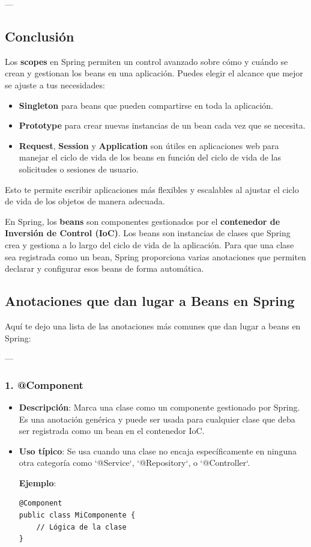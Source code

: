 \documentclass[11pt]{article}
\begin{document}
---

\subsection{Conclusión}
\label{sec:orge40aae1}
Los \textbf{\textbf{scopes}} en Spring permiten un control avanzado sobre cómo y cuándo se crean y gestionan los beans en una aplicación. Puedes elegir el alcance que mejor se ajuste a tus necesidades:
\begin{itemize}
\item \textbf{\textbf{Singleton}} para beans que pueden compartirse en toda la aplicación.
\item \textbf{\textbf{Prototype}} para crear nuevas instancias de un bean cada vez que se necesita.
\item \textbf{\textbf{Request}}, \textbf{\textbf{Session}} y \textbf{\textbf{Application}} son útiles en aplicaciones web para manejar el ciclo de vida de los beans en función del ciclo de vida de las solicitudes o sesiones de usuario.
\end{itemize}

Esto te permite escribir aplicaciones más flexibles y escalables al ajustar el ciclo de vida de los objetos de manera adecuada.

En Spring, los \textbf{\textbf{beans}} son componentes gestionados por el \textbf{\textbf{contenedor de Inversión de Control (IoC)}}.
Los beans son instancias de clases que Spring crea y gestiona a lo largo del ciclo de vida de la aplicación. Para que una clase sea registrada como un bean, Spring proporciona varias anotaciones que permiten declarar y configurar esos beans de forma automática.

\subsection{Anotaciones que dan lugar a Beans en Spring}
\label{sec:org296274c}
Aquí te dejo una lista de las anotaciones más comunes que dan lugar a beans en Spring:

---

\subsubsection{1. \textbf{\textbf{@Component}}}
\label{sec:orgff614fb}
\begin{itemize}
\item \textbf{\textbf{Descripción}}: Marca una clase como un componente gestionado por Spring. Es una anotación genérica y puede ser usada para cualquier clase que deba ser registrada como un bean en el contenedor IoC.
\item \textbf{\textbf{Uso típico}}: Se usa cuando una clase no encaja específicamente en ninguna otra categoría como `@Service`, `@Repository`, o `@Controller`.

\textbf{\textbf{Ejemplo}}:
\begin{verbatim}
@Component
public class MiComponente {
    // Lógica de la clase
}
\end{verbatim}
\end{itemize}
\end{document}
